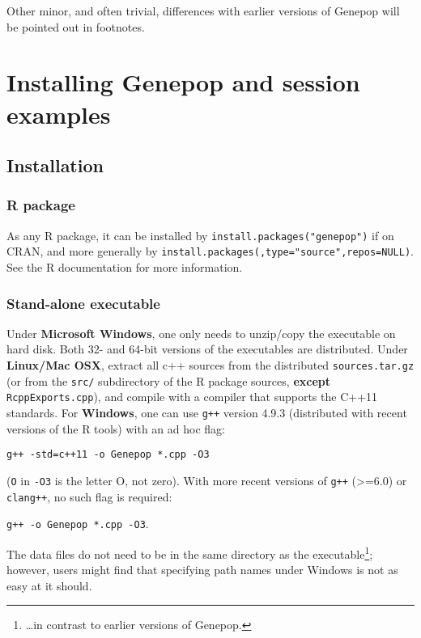 \documentclass[12pt,]{book}
\let\rmarkdownfootnote\footnote%
\def\footnote{\protect\rmarkdownfootnote}
\begin{document}
Other minor, and often trivial, differences with earlier versions of
Genepop will be pointed out in footnotes.

\chapter{Installing Genepop and session
examples}\label{installing-genepop-and-session-examples}

\section{Installation}\label{installation}

\subsection{R package}\label{r-package}

As any R package, it can be installed by
\texttt{install.packages("genepop")} if on CRAN, and more generally by
\texttt{install.packages(}\texttt{,type="source",repos=NULL)}. See the R
documentation for more information.

\subsection{Stand-alone executable}\label{stand-alone-executable}

Under \textbf{Microsoft
Windows}, one only needs to
unzip/copy the executable on hard disk. Both 32- and 64-bit versions of
the executables are distributed. Under \textbf{Linux/Mac
OSX},  extract all c++ sources
from the distributed \texttt{sources.tar.gz} (or from the \texttt{src/}
subdirectory of the R package sources, \textbf{except}
\texttt{RcppExports.cpp}), and compile with a compiler that supports the
C++11 standards. For \textbf{Windows}, one can use \texttt{g++} version
4.9.3 (distributed with recent versions of the R tools) with an ad hoc
flag:

\texttt{g++\ -std=c++11\ -o\ Genepop\ *.cpp\ -O3}

(\texttt{O} in \texttt{-O3} is the letter O, not zero). With more recent
versions of \texttt{g++} (\textgreater{}=6.0) or \texttt{clang++}, no
such flag is required:

\texttt{g++\ -o\ Genepop\ *.cpp\ -O3}.

The data files do not need to be in the same directory as the
executable\footnote{\ldots{}in contrast to earlier versions of Genepop.};
however, users might find that specifying path names under Windows is
not as easy at it should.
\end{document}
